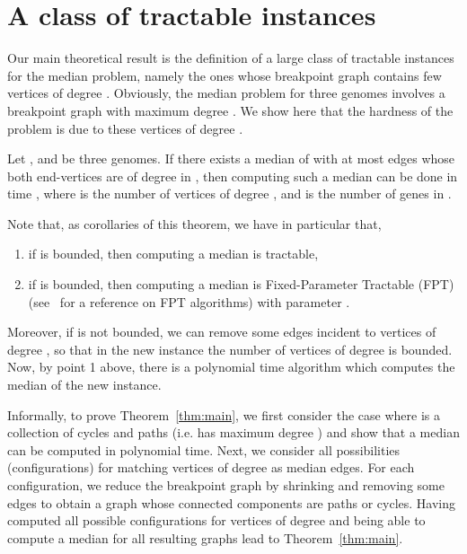 \documentclass[10pt]{llncs}
\begin{document}
\section{A class of tractable instances}\label{sec:results}

Our main theoretical result is the definition of a large class of
tractable instances for the median problem, namely the ones whose
breakpoint graph contains few vertices of degree . Obviously, the
median problem for three genomes involves a breakpoint graph with
maximum degree . We show here that the hardness of the problem is due
to these vertices of degree .

\begin{theorem}\label{thm:main}
  Let , and  be three genomes. If there exists a median
  of  with at most  edges whose both
  end-vertices are of degree  in , then computing such a median
  can be done in time , where  is the number of vertices of degree , and
   is the number of genes in .
\end{theorem}

\begin{remark}\label{rem:corollaries}
  Note that, as corollaries of this theorem, we have in particular that, 
  \begin{enumerate}
  \item if  is bounded, then computing a median is tractable,
  \item if  is bounded, then computing a median is Fixed-Parameter
    Tractable (FPT) (see~\cite{niedermeier-2008} for a reference on FPT
    algorithms) with parameter .  
  \end{enumerate}
  Moreover, if  is not bounded, we can remove some edges incident
  to vertices of degree , so that in the new instance the number of
  vertices of degree  is bounded. Now, by point 1 above, there is a
  polynomial time algorithm which computes the median of the new
  instance. \end{remark} 

Informally, to prove Theorem~\ref{thm:main}, we first consider the
case where  is a collection of cycles and paths (i.e. has maximum
degree ) and show that a median can be computed in polynomial
time. Next, we consider all possibilities (configurations) for
matching vertices of degree  as median edges. For each configuration,
we reduce the breakpoint graph by shrinking and removing some edges to
obtain a graph whose connected components are paths or cycles. Having
computed all possible configurations for vertices of degree  and
being able to compute a median for all resulting graphs lead to
Theorem~\ref{thm:main}.
\end{document}
